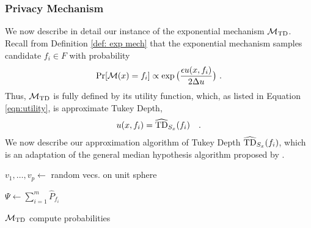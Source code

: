 \graphicspath{{./chapters/chapter3/}}
\chapter{ }

\label{sec:stc priv appendix} 

\subsection{Privacy Mechanism}
We now describe in detail our instance of the exponential mechanism $\mathcal{M}_{\text{TD}}$. Recall from Definition \ref{def: exp mech} that the exponential mechanism samples candidate $f_i \in F$ with probability
\begin{align*}
	\Pr[\mathcal{M}(x) = f_i] \propto \exp\big( \frac{\epsilon u(x, f_i)}{2 \Delta u} \big) \ .
\end{align*}
Thus, $\mathcal{M}_{\text{TD}}$ is fully defined by its utility function, which, as listed in Equation \eqref{eqn:utility}, is approximate Tukey Depth, 
\begin{align*}
u(x, f_i) = \widehat{\text{TD}}_{S_x}(f_i) \quad.
\end{align*}
We now describe our approximation algorithm of Tukey Depth $\widehat{\text{TD}}_{S_x}(f_i)$, which is an adaptation of the general median hypothesis algorithm proposed by \citet{median_hyp}. 

\begin{algorithm}

    
    $v_1, \dots, v_p \gets $ random vecs. on unit sphere 
    
  
    
    
    $\Psi \gets \sum_{i=1}^{m} \hat{P}_{f_i}$
    
    
    \caption{$\mathcal{M}_{\text{TD}}$ compute probabilities}
    \label{alg:main alg}
\end{algorithm}


